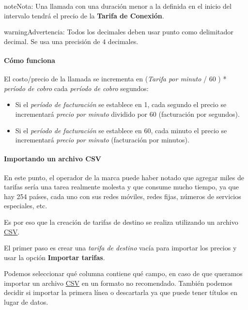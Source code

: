 \documentclass[letterpaper,10pt,spanish]{sphinxmanual}
\begin{document}
\begin{notice}{note}{Nota:}
Una llamada con una duración menor a la definida en el inicio del intervalo tendrá el precio de la \textbf{Tarifa de Conexión}.
\end{notice}

\begin{notice}{warning}{Advertencia:}
Todos los decimales deben usar punto como delimitador decimal. Se usa una precisión de 4 decimales.
\end{notice}
\paragraph{Cómo funciona}

El costo/precio de la llamada se incrementa en (\emph{Tarifa por minuto} / 60 ) * \emph{período de cobro} cada \emph{período de cobro} segundos:
\begin{itemize}
\item {} 
Si el \emph{período de facturación} se establece en 1, cada segundo el precio se incrementará \emph{precio por minuto} dividido por 60 (facturación por segundos).

\item {} 
Si el \emph{período de facturación} se establece en 60, cada minuto el precio se incrementará \emph{precio por minuto} (facturación por minutos).

\end{itemize}


\paragraph{Importando un archivo CSV}
\label{administration_portal/brand/billing/destination_rates:importing-a-csv-file}\label{administration_portal/brand/billing/destination_rates:id3}
En este punto, el operador de la marca puede haber notado que agregar miles de tarifas sería una tarea realmente molesta y que consume mucho tiempo, ya que hay 254 países, cada uno con sus redes móviles, redes fijas, números de servicios especiales, etc.

Es por eso que la creación de tarifas de destino se realiza utilizando un archivo \href{https://es.wikipedia.org/wiki/CSV}{CSV}.

El primer paso es crear una \emph{tarifa de destino} vacía para importar los precios y usar la opción \textbf{Importar tarifas}.

Podemos seleccionar qué columna contiene qué campo, en caso de que queramos importar un archivo \href{https://es.wikipedia.org/wiki/CSV}{CSV} en un formato no recomendado. También podemos decidir si importar la primera línea o descartarla ya que puede tener títulos en lugar de datos.
\end{document}
